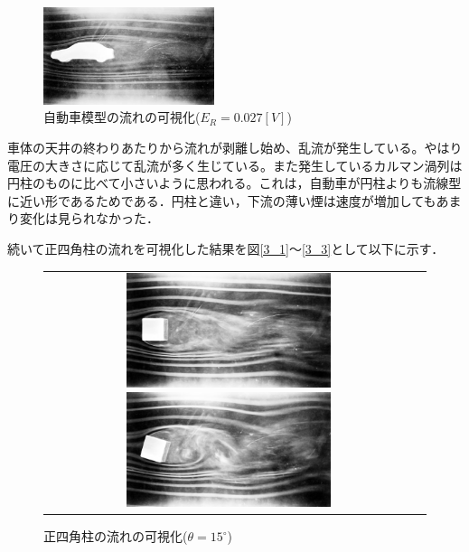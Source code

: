 \documentclass[a4paper,11pt,uplatex]{jsarticle}
\begin{document}
\begin{figure}[H]
  \begin{center}
    \includegraphics[width = 5cm]{pic/013.jpg}
    \caption{自動車模型の流れの可視化($E_R = 0.027[V]$)}
    \label{2_3}
  \end{center}
\end{figure}

車体の天井の終わりあたりから流れが剥離し始め、乱流が発生している。やはり電圧の大きさに応じて乱流が多く生じている。また発生しているカルマン渦列は円柱のものに比べて小さいように思われる。これは，自動車が円柱よりも流線型に近い形であるためである．円柱と違い，下流の薄い煙は速度が増加してもあまり変化は見られなかった．

続いて正四角柱の流れを可視化した結果を図\ref{3_1}〜\ref{3_3}として以下に示す．
\begin{figure}[H]
  \begin{tabular}{cc}
    \begin{minipage}{0.5\hsize}
      \centering
      \includegraphics[width = 6cm]{pic/004.jpg}
      \caption{正四角柱の流れの可視化($\theta = 0 ^{\circ}$)}
      \label{3_1}
    \end{minipage}

    \begin{minipage}{0.5\hsize}
      \centering
      \includegraphics[width = 6cm]{pic/005.jpg}
      \caption{正四角柱の流れの可視化($\theta = 15 ^{\circ}$)}
      \label{3_2}
    \end{minipage}
  \end{tabular}
\end{figure}
\end{document}
